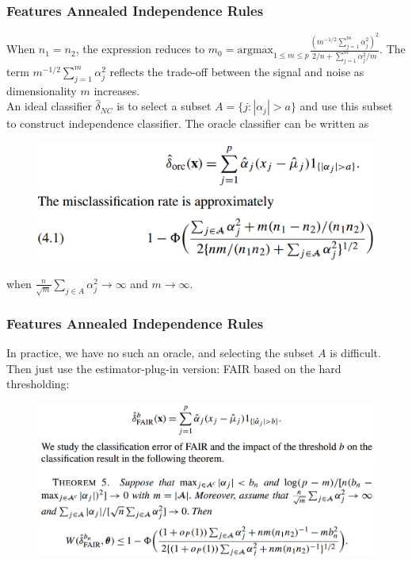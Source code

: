\documentclass{beamer}
\begin{document}
	\begin{frame}
		\frametitle{Features Annealed Independence Rules}
		When $n_1 = n_2$, the expression reduces to $m_0 = \text{argmax}_{1\leq m\leq p}\frac{(m^{-1/2}\sum_{j=1}^{m}\alpha_j^2)^2}{2/n + \sum_{j=1}^{m}\alpha_j^2/m}$. The term $m^{-1/2}\sum_{j=1}^{m}\alpha_j^2$ reflects the trade-off between the signal and noise as dimensionality $m$ increases.\\
		\vspace{\baselineskip}
		An ideal classifier $\hat{\delta}_{NC}$ is to select a subset $A = \{j: |\alpha_j| > a\}$ and use this subset to construct independence classifier. The oracle classifier can be written as 
		\begin{figure}
			\includegraphics[width=.7\linewidth]{image009.png}
		\end{figure} 
		when $\frac{n}{\sqrt{m}}\sum_{j \in A}\alpha_j^2 \to \infty$ and $m \to \infty$.
	\end{frame}
	
	\begin{frame}
		\frametitle{Features Annealed Independence Rules}
		In practice, we have no such an oracle, and selecting the subset $A$ is difficult. Then just use the estimator-plug-in version: FAIR based on the hard thresholding:
		\begin{figure}
			\includegraphics[width=.9\linewidth]{image010.png}
		\end{figure}
	\end{frame}
	
\end{document}
